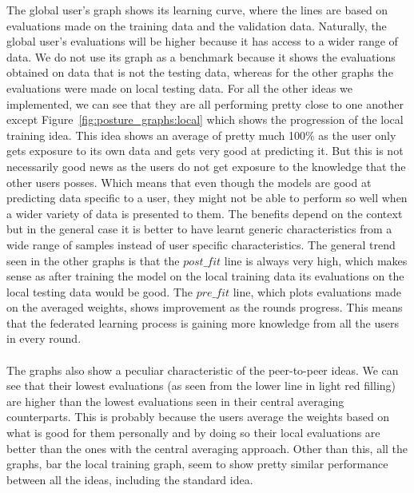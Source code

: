 \documentclass[12pt]{article}
\begin{document}
The global user's graph shows its learning curve, where the lines are based on evaluations made on the training data and the validation data. Naturally, the global user's evaluations will be higher because it has access to a wider range of data. We do not use its graph as a benchmark because it shows the evaluations obtained on data that is not the testing data, whereas for the other graphs the evaluations were made on local testing data. For all the other ideas we implemented, we can see that they are all performing pretty close to one another except Figure~\ref{fig:posture_graphs:local} which shows the progression of the local training idea. This idea shows an average of pretty much 100\% as the user only gets exposure to its own data and gets very good at predicting it. But this is not necessarily good news as the users do not get exposure to the knowledge that the other users posses. Which means that even though the models are good at predicting data specific to a user, they might not be able to perform so well when a wider variety of data is presented to them. The benefits depend on the context but in the general case it is better to have learnt generic characteristics from a wide range of samples instead of user specific characteristics. The general trend seen in the other graphs is that the $post\_fit$ line is always very high, which makes sense as after training the model on the local training data its evaluations on the local testing data would be good. The $pre\_fit$ line, which plots evaluations made on the averaged weights, shows improvement as the rounds progress. This means that the federated learning process is gaining more knowledge from all the users in every round. 
\\\\
The graphs also show a peculiar characteristic of the peer-to-peer ideas. We can see that their lowest evaluations (as seen from the lower line in light red filling) are higher than the lowest evaluations seen in their central averaging counterparts. This is probably because the users average the weights based on what is good for them personally and by doing so their local evaluations are better than the ones with the central averaging approach. Other than this, all the graphs, bar the local training graph, seem to show pretty similar performance between all the ideas, including the standard idea.
\end{document}
